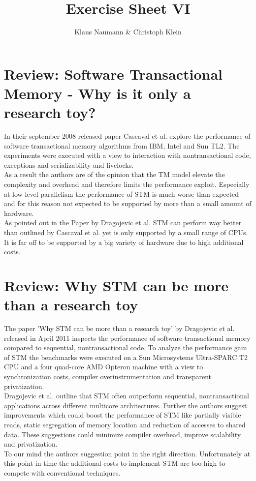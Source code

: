 \documentclass[oneside,a4paper]{scrartcl}
\begin{document}

\title{Exercise Sheet VI}
\subject{Advanced Parallel Computing}
\author{Klaus Naumann \& Christoph Klein}
\maketitle

\section{Review: Software Transactional Memory - Why is it only a research toy?}
In their september 2008 released paper Cascaval et al. explore the performance 
of software transactional memory algorithms from IBM, Intel and Sun TL2. The 
experiments were executed with a view to interaction with nontransactional code, 
exceptions and serializability and livelocks.
\\
As a result the authors are of the opinion that the TM model elevate the 
complexity and overhead and therefore limits the performance exploit. Especially 
at low-level parallelism the performance of STM is much worse than expected and 
for this reason not expected to be supported by more than a small amount of hardware.
\\
As pointed out in the Paper by Dragojevic et al. STM can perform way better than 
outlined by Cascaval et al. yet is only supported by a small range of CPUs. It is
far off to be supported by a big variety of hardware due to high additional costs.     

\section{Review: Why STM can be more than a research toy}
The paper 'Why STM can be more than a research toy' by Dragojevic et al. released 
in April 2011 inspects the performance of software transactional memory compared 
to sequential, nontransactional code. To analyze the performance gain of STM the 
benchmarks were executed on a Sun Microsystems Ultra-SPARC T2 CPU and a four 
quad-core AMD Opteron machine with a view to synchronization costs, compiler 
overinstrumentation and transparent privatization.
\\
Dragojevic et al. outline that STM often outperform sequential, nontransactional 
applications across different multicore architectures. Further the authors suggest 
improvements which could boost the performance of STM like partially visible reads, 
static segregation of memory location and reduction of accesses to shared data. 
These suggestions could minimize compiler overhead, improve scalability and privatization.
\\
To our mind the authors suggestion point in the right direction. Unfortunately at 
this point in time the additional costs to implement STM are too high to compete 
with conventional techniques.    
\end{document}
